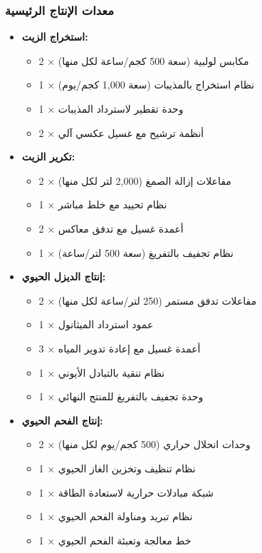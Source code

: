 \subsubsection{معدات الإنتاج الرئيسية}
\begin{itemize}
    \item \textbf{استخراج الزيت:}
    \begin{itemize}
        \item 2 × مكابس لولبية (سعة 500 كجم/ساعة لكل منها)
        \item 1 × نظام استخراج بالمذيبات (سعة 1,000 كجم/يوم)
        \item 1 × وحدة تقطير لاسترداد المذيبات
        \item 2 × أنظمة ترشيح مع غسيل عكسي آلي
    \end{itemize}
    
    \item \textbf{تكرير الزيت:}
    \begin{itemize}
        \item 2 × مفاعلات إزالة الصمغ (2,000 لتر لكل منها)
        \item 1 × نظام تحييد مع خلط مباشر
        \item 2 × أعمدة غسيل مع تدفق معاكس
        \item 1 × نظام تجفيف بالتفريغ (سعة 500 لتر/ساعة)
    \end{itemize}
    
    \item \textbf{إنتاج الديزل الحيوي:}
    \begin{itemize}
        \item 2 × مفاعلات تدفق مستمر (250 لتر/ساعة لكل منها)
        \item 1 × عمود استرداد الميثانول
        \item 3 × أعمدة غسيل مع إعادة تدوير المياه
        \item 1 × نظام تنقية بالتبادل الأيوني
        \item 1 × وحدة تجفيف بالتفريغ للمنتج النهائي
    \end{itemize}
    
    \item \textbf{إنتاج الفحم الحيوي:}
    \begin{itemize}
        \item 2 × وحدات انحلال حراري (500 كجم/يوم لكل منها)
        \item 1 × نظام تنظيف وتخزين الغاز الحيوي
        \item 1 × شبكة مبادلات حرارية لاستعادة الطاقة
        \item 1 × نظام تبريد ومناولة الفحم الحيوي
        \item 1 × خط معالجة وتعبئة الفحم الحيوي
    \end{itemize}
\end{itemize}

